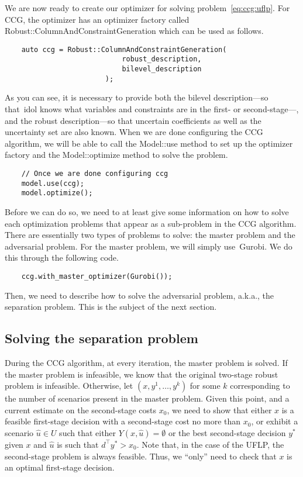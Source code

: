 We are now ready to create our optimizer for solving
problem~\eqref{eq:ccg:uflp}. For CCG, the optimizer has an optimizer factory
called \textsf{Robust::ColumnAndConstraintGeneration} which can be used as
follows. 
%
\begin{lstlisting}
    auto ccg = Robust::ColumnAndConstraintGeneration(
                            robust_description,
                            bilevel_description
                        );
\end{lstlisting}
As you can see, it is necessary to provide both the bilevel description---so
that~\textsf{idol} knows what variables and constraints are in the first- or
second-stage---, and the robust description---so that uncertain coefficients
as well as the uncertainty set are also known. When we are done configuring
the CCG algorithm, we will be able to call the \textsf{Model::use} method to
set up the optimizer factory and the \textsf{Model::optimize} method to solve
the problem.
%
\begin{lstlisting}
    // Once we are done configuring ccg
    model.use(ccg);
    model.optimize();
\end{lstlisting}
Before we can do so, we need to at least give some information on how to solve
each optimization problems that appear as a sub-problem in the CCG algorithm.
There are essentially two types of problems to solve: the master problem and
the adversarial problem. For the master problem, we will simply
use~\textsf{Gurobi}. We do this through the following code.
%
\begin{lstlisting}
    ccg.with_master_optimizer(Gurobi());
\end{lstlisting}
Then, we need to describe how to solve the adversarial problem, a.k.a., the
separation problem. This is the subject of the next section.

\subsection{Solving the separation problem}

During the CCG algorithm, at every iteration, the master problem is solved. If
the master problem is infeasible, we know that the original two-stage robust
problem is infeasible. Otherwise, let $(x,y^1,\dotsc,y^k)$ for some $k$
corresponding to the number of scenarios present in the master problem. Given
this point, and a current estimate on the second-stage costs $x_0$, we need to
show that either $x$ is a feasible first-stage decision with a second-stage
cost no more than $x_0$, or exhibit a scenario $\hat{u}\in U$ such that either
$Y(x,\hat{u}) = \emptyset$ or the best second-stage decision $y^*$ given $x$
and $\hat{u}$ is such that $d^\top y^* > x_0$. Note that, in the case of the
UFLP, the second-stage problem is always feasible. Thus, we ``only'' need to
check that $x$ is an optimal first-stage decision. 

